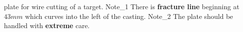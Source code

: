 \label{fig:Casting} \MgZnCa plate for wire cutting of a target. Note_{1} There is \textbf{fracture line} beginning at $43mm$ which curves into the left of the casting. Note_{2} The plate should be handled with \textbf{extreme} care.